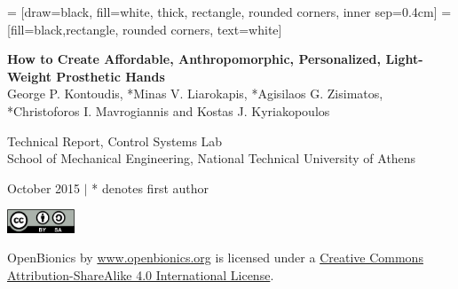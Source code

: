 \documentclass[a4paper]{report}
\begin{document}
	 = [draw=black, fill=white, thick, rectangle, rounded corners, inner sep=0.4cm]
	 =[fill=black,rectangle, rounded corners, text=white]

	\begin{titlepage}
	\begin{center}
		{ \Large \bfseries How to Create Affordable, Anthropomorphic, Personalized, Light-Weight Prosthetic Hands\\[0.5cm] }
                { \large *George P. Kontoudis, *Minas V. Liarokapis, *Agisilaos G. Zisimatos, *Christoforos I. Mavrogiannis and Kostas J. Kyriakopoulos}

                \vspace{1.4in}


                \vspace{1.7in}

		{ \large Technical Report, Control Systems Lab\\
                   School of Mechanical Engineering, National Technical University of Athens \\[0.5cm] }

		{ \large October 2015 $|$ * denotes first author\\[0.5cm]}
		
		
	\end{center}
	\end{titlepage}

	\newpage


	\begin{minipage}{0.2\textwidth}
		\includegraphics[width=2cm]{figures/License.png}
	\end{minipage}
	\begin{minipage}{0.8\textwidth}
		\begin{flushleft} \small        
			OpenBionics by \url{www.openbionics.org} is licensed under a  \href{https://creativecommons.org/licenses/by-sa/4.0/}{Creative Commons Attribution-ShareAlike 4.0 International License}.
		\end{flushleft}
	\end{minipage}
\end{document}
